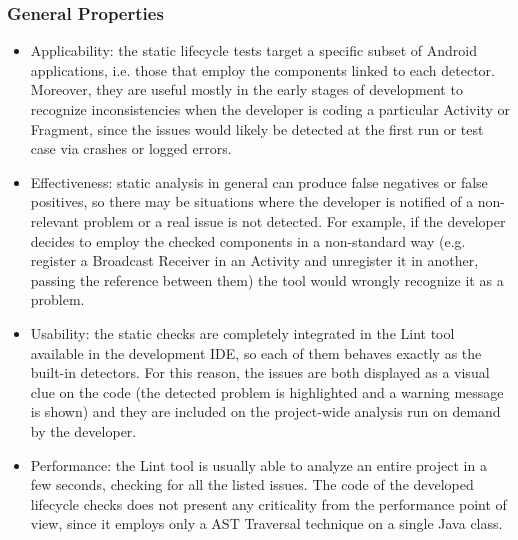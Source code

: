 \documentclass[11pt,a4paper,notitlepage]{article}
\begin{document}

\subsubsection{General Properties}
\begin{itemize}
	\item Applicability: the static lifecycle tests target a specific subset of Android applications, i.e. those that employ the components linked to each detector. Moreover, they are useful mostly in the early stages of development to recognize inconsistencies when the developer is coding a particular Activity or Fragment, since the issues would likely be detected at the first run or test case via crashes or logged errors.
	\item Effectiveness: static analysis in general can produce false negatives or false positives, so there may be situations where the developer is notified of a non-relevant problem or a real issue is not detected. For example, if the developer decides to employ the checked components in a non-standard way (e.g. register a Broadcast Receiver in an Activity and unregister it in another, passing the reference between them) the tool would wrongly recognize it as a problem.
	\item Usability: the static checks are completely integrated in the Lint tool available in the development IDE, so each of them behaves exactly as the built-in detectors. For this reason, the issues are both displayed as a visual clue on the code (the detected problem is highlighted and a warning message is shown) and they are included on the project-wide analysis run on demand by the developer.
	\item Performance: the Lint tool is usually able to analyze an entire project in a few seconds, checking for all the listed issues. The code of the developed lifecycle checks does not present any criticality from the performance point of view, since it employs only a AST Traversal technique on a single Java class.
\end{itemize}
\end{document}
